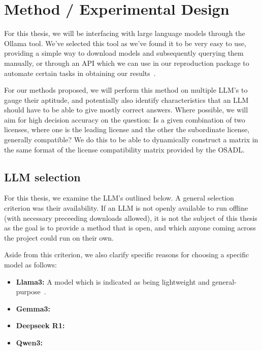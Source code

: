 
\chapter{Method / Experimental Design}\label{ch:method}


For this thesis, we will be interfacing with large language models through the Ollama tool. We've selected this tool as we've found it to be very easy to use, providing a simple way to download models and subsequently querying them manually, or through an API which we can use in our reproduction package to automate certain tasks in obtaining our results~\cite{ollama_docs}.

For our methods proposed, we will perform this method on multiple LLM's to gauge their aptitude, and potentially also identify characteristics that an LLM should have to be able to give mostly correct answers. Where possible, we will aim for high decision accuracy on the question: Is a given combination of two licenses, where one is the leading license and the other the subordinate license, generally compatible? We do this to be able to dynamically construct a matrix in the same format of the license compatibility matrix provided by the OSADL.

\section{LLM selection}

For this thesis, we examine the LLM's outlined below. A general selection criterion was their availability. If an LLM is not openly available to run offline (with necessary preceeding downloads allowed), it is not the subject of this thesis as the goal is to provide a method that is open, and which anyone coming across the project could run on their own.

Aside from this criterion, we also clarify specific reasons for choosing a specific model as follows:
\begin{itemize}
	\item \textbf{Llama3:} A model which is indicated as being lightweight and general-purpose~\cite{ollama_llama3}.
	\item \textbf{Gemma3:} \cite{ollama_gemma3}
	\item \textbf{Deepseek R1:} \cite{ollama_deepseekr1}
	\item \textbf{Qwen3:} \cite{ollama_qwen3}
\end{itemize}




